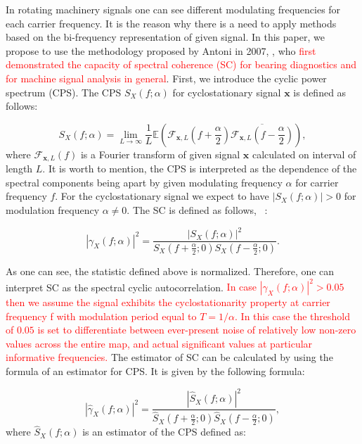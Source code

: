 \documentclass[3p, 12pt]{elsarticle} %
\begin{document}
In rotating machinery signals one can see different modulating frequencies for each carrier frequency. It is the reason why there is a need to apply methods based on the bi-frequency representation of given signal. In this paper, we propose to use the methodology proposed by Antoni in 2007, \cite{antoni2007cyclic}, who \textcolor{red}{first demonstrated the capacity of spectral coherence (SC) for bearing diagnostics and for machine signal analysis in general}. First, we introduce the cyclic power spectrum (CPS). The CPS $S_X(f;\alpha)$ for cyclostationary signal $\mathbf{x}$ is defined as follows:

\begin{equation}
\label{eq:CPS}
S_X(f;\alpha)=\lim_{L\to \infty} \frac{1}{L}\mathbb{E} \left(\mathcal{F}_{\mathbf{x},L} \left(f+\frac{\alpha}{2}\right)\overline{\mathcal{F}_{\mathbf{x},L}\left(f-\frac{\alpha}{2}\right)}\right),
\end{equation}
where $\mathcal{F}_{\mathbf{x},L}(f)$ is a Fourier transform of given signal $\mathbf{x}$ calculated on interval of length $L$. It is worth to mention, the CPS is interpreted as the dependence of the spectral components being apart by given modulating frequency $\alpha$ for carrier frequency $f$. For the cyclostationary signal we expect to have $\left|S_X(f;\alpha)\right|>0$ for modulation frequency $\alpha\neq 0$. The SC is defined as follows, ~\cite{antoni2007cyclic}:

\begin{equation}
\label{eq:SC}
\left|\gamma_X(f;\alpha)\right|^{2}=\frac { \left|S_X(f;\alpha)\right|^2 }{ S_X(f+\frac{\alpha}{2};0)S_X(f-\frac{\alpha}{2};0)}.
\end{equation}

As one can see, the statistic defined above is normalized. Therefore, one can interpret SC as the spectral cyclic autocorrelation. \textcolor{red}{In case $\left|\gamma_X(f;\alpha)\right|^{2}>0.05$  then we assume the signal exhibits the cyclostationarity property at carrier frequency f with modulation period equal to $T=1/\alpha$. In this case the threshold of $0.05$ is set to differentiate between ever-present noise of relatively low non-zero values across the entire map, and actual significant values at particular informative frequencies.}
The estimator of SC can be calculated by using the formula of an estimator for CPS. It is given by the following formula:

\begin{equation}
\left|\hat{\gamma}_X(f;\alpha)\right|^{2}=\frac{ \left|\hat{S}_X(f;\alpha)\right|^2 
}{\hat{S}_X(f+\frac{\alpha}{2};0)\hat{S}_X(f-\frac{\alpha}{2};0)},
\end{equation} 
where $\hat{S}_X(f;\alpha)$ is an estimator of the CPS defined as:
\end{document}
